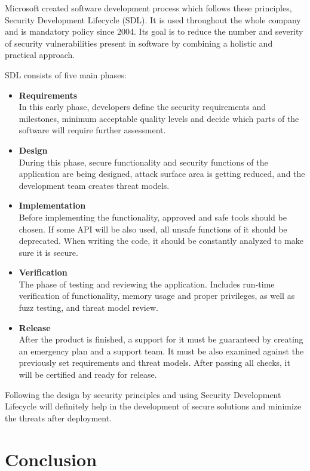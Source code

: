 \documentclass[a4paper]{article}
\begin{document}
Microsoft created software development process which follows these principles,
Security Development Lifecycle (SDL)\autocite{sdl}. It is used throughout the
whole company and is mandatory policy since 2004. Its goal is to reduce the
number and severity of security vulnerabilities present in software by
combining a holistic and practical approach.

SDL consists of five main phases:

\begin{itemize}
	\item \textbf{Requirements} \\
		In this early phase, developers define the security
		requirements and milestones, minimum acceptable quality levels
		and decide which parts of the software will require further
		assessment.
	\item \textbf{Design} \\
		During this phase, secure functionality and security functions
		of the application are being designed, attack surface area is
		getting reduced, and the development team creates threat models.
	\item \textbf{Implementation} \\
		Before implementing the functionality, approved and safe tools
		should be chosen. If some API will be also used, all unsafe
		functions of it should be deprecated. When writing the code, it
		should be constantly analyzed to make sure it is secure.
	\item \textbf{Verification} \\
		The phase of testing and reviewing the application. Includes
		run-time verification of functionality, memory usage and proper
		privileges, as well as fuzz testing, and threat model review.
	\item \textbf{Release} \\
		After the product is finished, a support for it must be
		guaranteed by creating an emergency plan and a support team. It
		must be also examined against the previously set requirements
		and threat models. After passing all checks, it will be
		certified and ready for release.
\end{itemize}

Following the design by security principles and using Security Development
Lifecycle will definitely help in the development of secure solutions and
minimize the threats after deployment.

\newpage

\section{Conclusion}
\end{document}
